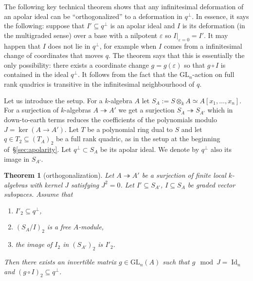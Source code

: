 \documentclass{amsart}
\newcommand{\onto}{\twoheadrightarrow}
\DeclareMathOperator{\Id}{Id}
\newcommand{\GL}{\mathrm{GL}}%
\newtheorem{theorem}[lemma]{\bf Theorem}
\begin{document}
The following key technical theorem shows that any
infinitesimal deformation of an apolar ideal can be ``orthogonalized'' to a
deformation in $q^\perp$. In essence, it says the following: suppose that
$I'\subseteq q^\perp$ is an apolar ideal and $I$ is its
deformation (in the multigraded sense) over a base with a nilpotent $\varepsilon$ so $I|_{\varepsilon=0} = I'$.
It may happen that $I$ does not lie in $q^\perp$, for
example when $I$ comes from a infinitesimal change of coordinates that moves
$q$. The theorem says that this is essentially the only possibility: there exists a
coordinate change $g = g(\varepsilon)$ so that $g\circ I$ is contained in the
ideal $q^\perp$.
It follows from the fact that the $\GL_n$-action on full
rank quadrics is transitive in the infinitesimal neighbourhood of $q$.

Let us introduce the setup. For a $k$-algebra $A$ let $S_A :=
S\otimes_{k} A \simeq A[x_1, \ldots ,x_n]$. For a surjection of $k$-algebras
$A\onto A'$ we get a surjection $S_{A}\onto S_{A'}$ which in down-to-earth
terms reduces the
coefficients of the polynomials modulo $J = \ker(A\to A')$.
Let $T$ be a polynomial ring dual to $S$ and let $q\in T_2 \subseteq (T_A)_2$
be a full rank quadric, as in the setup at the beginning of~\S\ref{sec:apolarity}. Let $q^\perp\subset S_A$ be its apolar ideal. We denote
by $q^\perp$ also its image in $S_{A'}$.
\begin{theorem}[orthogonalization]\label{thm:orthogonalization}
    Let $A\onto A'$ be a surjection of finite local $k$-algebras with kernel $J$ satisfying $J^2
    = 0$. Let $I' \subseteq S_{A'}$, $I\subseteq S_A$ be graded vector
    subspaces.
    Assume that
    \begin{enumerate}
        \item $I'_2 \subseteq q^\perp$,
        \item $(S_A/I)_2$ is a free $A$-module,
        \item the image of $I_2$ in $(S_{A'})_2$ is $I'_2$.
    \end{enumerate}
    Then there exists an invertible matrix $g\in \GL_n(A)$ such that $g\mod J =
    \Id_n$ and $(g\circ I)_2 \subseteq q^\perp$.
\end{theorem}
\end{document}
